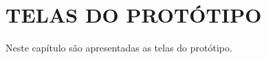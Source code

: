 \chapter{TELAS DO PROTÓTIPO} \label{telas}

Neste capítulo são apresentadas as telas do protótipo.

